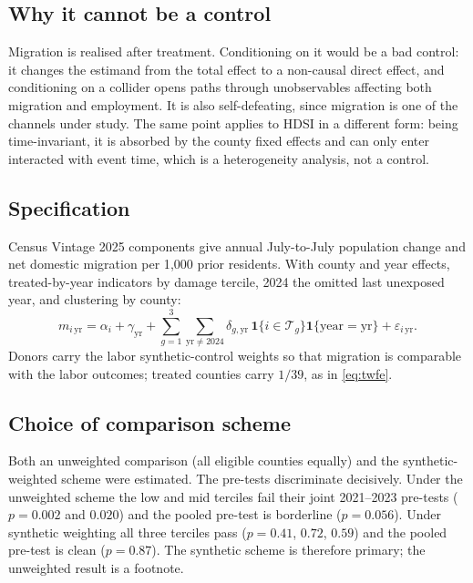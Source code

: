 \documentclass[11pt,a4paper]{article}
\newcommand{\Tr}{\mathcal{T}}
\newcommand{\ind}{\mathbf{1}}
\begin{document}
\subsection{Why it cannot be a control}
Migration is realised after treatment. Conditioning on it would be a bad control: it changes the
estimand from the total effect to a non-causal direct effect, and conditioning on a collider opens
paths through unobservables affecting both migration and employment. It is also self-defeating, since
migration is one of the channels under study. The same point applies to HDSI in a different form: being
time-invariant, it is absorbed by the county fixed effects and can only enter interacted with event
time, which is a heterogeneity analysis, not a control.

\subsection{Specification}
Census Vintage 2025 components give annual July-to-July population change and net domestic migration
per 1{,}000 prior residents. With county and year effects, treated-by-year indicators by damage
tercile, 2024 the omitted last unexposed year, and clustering by county:
\begin{equation}
m_{i\,\text{yr}}=\alpha_i+\gamma_{\text{yr}}+\sum_{g=1}^{3}\sum_{\text{yr}\ne2024}\delta_{g,\text{yr}}\,\ind\{i\in\Tr_g\}\ind\{\text{year}=\text{yr}\}+\varepsilon_{i\,\text{yr}} .
\end{equation}
Donors carry the labor synthetic-control weights so that migration is comparable with the labor
outcomes; treated counties carry $1/39$, as in \eqref{eq:twfe}.

\subsection{Choice of comparison scheme}
Both an unweighted comparison (all eligible counties equally) and the synthetic-weighted scheme were
estimated. The pre-tests discriminate decisively. Under the unweighted scheme the low and mid terciles
fail their joint 2021--2023 pre-tests ($p=0.002$ and $0.020$) and the pooled pre-test is borderline
($p=0.056$). Under synthetic weighting all three terciles pass ($p=0.41$, $0.72$, $0.59$) and the
pooled pre-test is clean ($p=0.87$). The synthetic scheme is therefore primary; the unweighted result
is a footnote.
\end{document}
